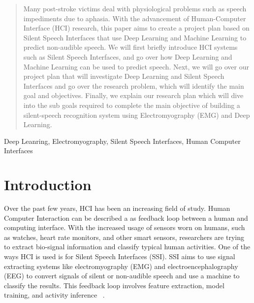 \documentclass[conference]{IEEEtran}
\begin{document}
\begin{abstract}
Many post-stroke victims deal with physiological problems such as speech impediments
due to aphasia. With the advancement of Human-Computer Interface (HCI) research,
this paper aims to create a project plan based on Silent Speech Interfaces that use
Deep Learning and Machine Learning to predict non-audible speech. We will first
briefly introduce HCI systems such as Silent Speech Interfaces, and go over how
Deep Learning and Machine Learning can be used to predict speech. Next, we will
go over our project plan that will investigate Deep Learning and Silent Speech
Interfaces and go over the research problem, which will identify the main goal
and objectives. Finally, we explain our research plan which will dive into the
sub goals required to complete the main objective of building a silent-speech
recognition system using Electromyography (EMG) and Deep Learning.
\end{abstract}

\begin{IEEEkeywords}
Deep Leanring, Electromyography, Silent Speech Interfaces, Human Computer Interfaces
\end{IEEEkeywords}


%
\IEEEpeerreviewmaketitle


\section{Introduction}
Over the past few years, HCI has been an increasing field of study. Human Computer
Interaction can be described a as feedback loop between a human and computing interface.
With the increased usage of sensors worn on humans, such as watches, heart rate monitors,
and other smart sensors, researchers are trying to extract bio-signal information and classify
typical human activities. One of the ways HCI is used is for Silent Speech Interfaces
(SSI). SSI aims to use signal extracting systems like electromyography (EMG) and
electroencephalography (EEG) to convert signals of silent or non-audible speech
and use a machine to classify the results. This feedback loop involves feature
extraction, model training, and activity inference ~\cite{lukas_masuch_deep_nodate}.
\end{document}

